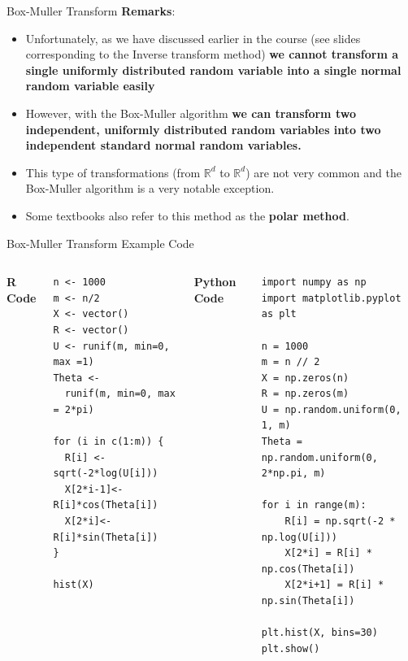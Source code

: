 \documentclass[8pt]{beamer}
\begin{document}
\begin{frame}{Box-Muller Transform}
\textbf{Remarks}: 

\begin{itemize}
	\item Unfortunately, as we have discussed earlier in the course (see slides corresponding to the Inverse transform method) \textbf{we cannot transform a single uniformly distributed random variable into a single normal random variable easily}
	\item However, with the Box-Muller algorithm \textbf{we can transform two independent, uniformly distributed random variables into two independent standard normal random variables.}
	\item This type of transformations (from $\mathbb{R}^d$ to $\mathbb{R}^d$) are not very common and the Box-Muller algorithm is a very notable exception.
	\item Some textbooks also refer to this method as the \textbf{polar method}.
\end{itemize}
\end{frame}

\begin{frame}[fragile]{Box-Muller Transform Example}
\alert{Code}
\vspace{2mm}

\begin{columns}
\textbf{R Code}
\begin{lstlisting}
n <- 1000
m <- n/2
X <- vector()
R <- vector()
U <- runif(m, min=0, max =1)
Theta <- 
  runif(m, min=0, max = 2*pi) 

for (i in c(1:m)) {
  R[i] <- sqrt(-2*log(U[i])) 
  X[2*i-1]<- R[i]*cos(Theta[i]) 
  X[2*i]<- R[i]*sin(Theta[i])
} 

hist(X)
\end{lstlisting}

\textbf{Python Code}

\begin{lstlisting}
import numpy as np
import matplotlib.pyplot as plt

n = 1000
m = n // 2
X = np.zeros(n)
R = np.zeros(m)
U = np.random.uniform(0, 1, m)
Theta = np.random.uniform(0, 2*np.pi, m)

for i in range(m):
    R[i] = np.sqrt(-2 * np.log(U[i]))
    X[2*i] = R[i] * np.cos(Theta[i])
    X[2*i+1] = R[i] * np.sin(Theta[i])

plt.hist(X, bins=30)
plt.show()
\end{lstlisting}
\end{columns}
\end{frame}
\end{document}
